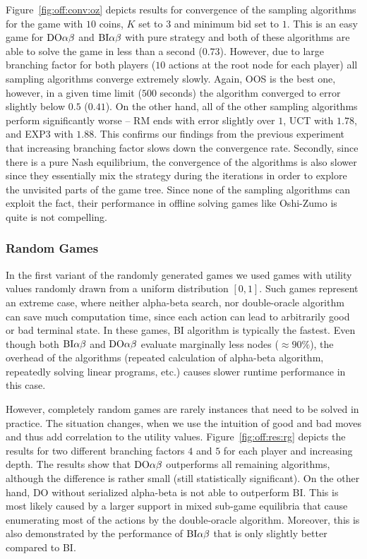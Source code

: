 Figure~\ref{fig:off:conv:oz} depicts results for convergence of the sampling algorithms for the game with $10$ coins, $K$ set to $3$ and minimum bid set to $1$. This is an easy game for $\textrm{DO}\alpha\beta$ and $\textrm{BI}\alpha\beta$ with pure strategy and both of these algorithms are able to solve the game in less than a second ($0.73$). However, due to large branching factor for both players ($10$ actions at the root node for each player) all sampling algorithms converge extremely slowly. Again, OOS is the best one, however, in a given time limit ($500$ seconds) the algorithm converged to error slightly below $0.5$ ($0.41$). On the other hand, all of the other sampling algorithms perform significantly worse -- RM ends with error slightly over $1$, UCT with $1.78$, and EXP3 with $1.88$.
This confirms our findings from the previous experiment that increasing branching factor slows down the convergence rate.
Secondly, since there is a pure Nash equilibrium, the convergence of the algorithms is also slower since they essentially mix the strategy during the iterations in order to explore the unvisited parts of the game tree. Since none of the sampling algorithms can exploit the fact, their performance in offline solving games like Oshi-Zumo is quite is not compelling.

\subsubsection{Random Games}
In the first variant of the randomly generated games we used games with utility values randomly drawn from a uniform distribution $[0,1]$. 
Such games represent an extreme case, where neither alpha-beta search, nor double-oracle algorithm can save much computation time, since each action can lead to arbitrarily good or bad terminal state. 
In these games, \textsc{BI} algorithm is typically the fastest.
Even though both $\textrm{BI}\alpha\beta$ and $\textrm{DO}\alpha\beta$ evaluate marginally less nodes ($\approx90\%$), the overhead of the algorithms (repeated calculation of alpha-beta algorithm, repeatedly solving linear programs, etc.) causes slower runtime performance in this case.

However, completely random games are rarely instances that need to be solved in practice.
The situation changes, when we use the intuition of good and bad moves and thus add correlation to the utility values.
Figure~\ref{fig:off:res:rg} depicts the results for two different branching factors $4$ and $5$ for each player and increasing depth.
The results show that $\textrm{DO}\alpha\beta$ outperforms all remaining algorithms, although the difference is rather small (still statistically significant).
On the other hand, \textsc{DO} without serialized alpha-beta is not able to outperform \textsc{BI}. 
This is most likely caused by a larger support in mixed sub-game equilibria that cause enumerating most of the actions by the double-oracle algorithm. 
Moreover, this is also demonstrated by the performance of $\textrm{BI}\alpha\beta$ that is only slightly better compared to \textsc{BI}.

